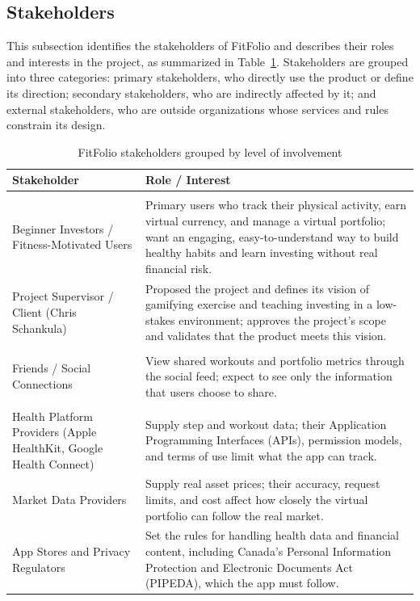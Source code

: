\documentclass{article}
\begin{document}
\subsection{Stakeholders}
This subsection identifies the stakeholders of FitFolio and describes their roles and interests in the project, as summarized in Table~\ref{tab:stakeholders}. Stakeholders are grouped into three categories: primary stakeholders, who directly use the product or define its direction; secondary stakeholders, who are indirectly affected by it; and external stakeholders, who are outside organizations whose services and rules constrain its design.
\begin{table}[H]
\caption{FitFolio stakeholders grouped by level of involvement}
\small
\centering
\renewcommand{\arraystretch}{1.3}
\begin{tabular}{>{\raggedright\arraybackslash}p{} >{\raggedright\arraybackslash}p{}}
\toprule
\textbf{Stakeholder} & \textbf{Role / Interest} \\
\midrule
\multicolumn{2}{l}{\textit{Primary Stakeholders}} \\
\midrule
Beginner Investors / Fitness-Motivated Users & Primary users who track their physical activity, earn virtual currency, and manage a virtual portfolio; want an engaging, easy-to-understand way to build healthy habits and learn investing without real financial risk. \\
Project Supervisor / Client (Chris Schankula) & Proposed the project and defines its vision of gamifying exercise and teaching investing in a low-stakes environment; approves the project's scope and validates that the product meets this vision. \\
\midrule
\multicolumn{2}{l}{\textit{Secondary Stakeholders}} \\
\midrule
Friends / Social Connections & View shared workouts and portfolio metrics through the social feed; expect to see only the information that users choose to share. \\
\midrule
\multicolumn{2}{l}{\textit{External Stakeholders}} \\
\midrule
Health Platform Providers (Apple HealthKit, Google Health Connect) & Supply step and workout data; their Application Programming Interfaces (APIs), permission models, and terms of use limit what the app can track. \\
Market Data Providers & Supply real asset prices; their accuracy, request limits, and cost affect how closely the virtual portfolio can follow the real market. \\
App Stores and Privacy Regulators & Set the rules for handling health data and financial content, including Canada's Personal Information Protection and Electronic Documents Act (PIPEDA), which the app must follow. \\
\bottomrule
\end{tabular}
\label{tab:stakeholders}
\end{table}
\end{document}
